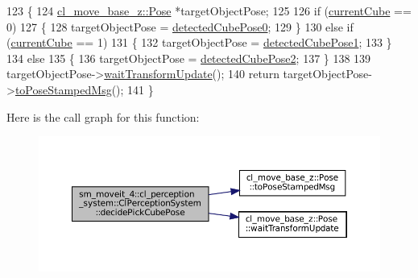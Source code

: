 \begin{DoxyCode}
123     \{
124         \hyperlink{classcl__move__base__z_1_1Pose}{cl\_move\_base\_z::Pose} *targetObjectPose;
125 
126         \textcolor{keywordflow}{if} (\hyperlink{classsm__moveit__4_1_1cl__perception__system_1_1ClPerceptionSystem_ae2a80b803814af8b3c87f810f2728af0}{currentCube} == 0)
127         \{
128             targetObjectPose = \hyperlink{classsm__moveit__4_1_1cl__perception__system_1_1ClPerceptionSystem_a184f61a0e35d78f680b911b389a84067}{detectedCubePose0};
129         \}
130         \textcolor{keywordflow}{else} \textcolor{keywordflow}{if} (\hyperlink{classsm__moveit__4_1_1cl__perception__system_1_1ClPerceptionSystem_ae2a80b803814af8b3c87f810f2728af0}{currentCube} == 1)
131         \{
132             targetObjectPose = \hyperlink{classsm__moveit__4_1_1cl__perception__system_1_1ClPerceptionSystem_a80b1c093616e33eaf980b344b19251f5}{detectedCubePose1};
133         \}
134         \textcolor{keywordflow}{else}
135         \{
136             targetObjectPose = \hyperlink{classsm__moveit__4_1_1cl__perception__system_1_1ClPerceptionSystem_a9e31ed8a256799d9b82605740b51246a}{detectedCubePose2};
137         \}
138 
139         targetObjectPose->\hyperlink{classcl__move__base__z_1_1Pose_a5f8576c3dacfb2f2e7f9df5105c480ea}{waitTransformUpdate}();
140         \textcolor{keywordflow}{return} targetObjectPose->\hyperlink{classcl__move__base__z_1_1Pose_a63887a88c1ac6e9a4a71b8d7d11aed6c}{toPoseStampedMsg}();
141     \}
\end{DoxyCode}
Here is the call graph for this function\+:
\nopagebreak
\begin{figure}[H]
\begin{center}
\leavevmode
\includegraphics[width=350pt]{classsm__moveit__4_1_1cl__perception__system_1_1ClPerceptionSystem_ab4abc387e9053b62464a542378d779e5_cgraph}
\end{center}
\end{figure}
\mbox{\label{classsm__moveit__4_1_1cl__perception__system_1_1ClPerceptionSystem_ab2431f4f2f48fc474e7b2f868bdec60d}} 
